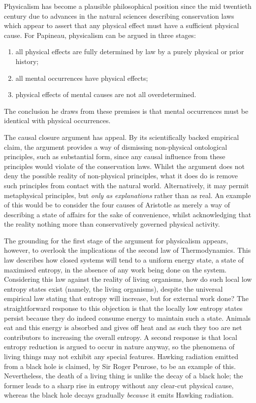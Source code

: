 Physicalism has become a plausible philosophical position since the mid twentieth century due to advances in the natural sciences describing conservation laws which appear to assert that any physical effect must have a sufficient physical cause. For Papineau, physicalism can be argued in three stages:
\begin{enumerate}
\item all physical effects are fully determined by law by a purely physical or prior history;
\item all mental occurrences have physical effects;
\item physical effects of mental causes are not all overdetermined.
\end{enumerate}
The conclusion he draws from these premises is that mental occurrences must be identical with physical occurrences. \parencite[][6]{Papineau2001-PAPTRO}

The causal closure argument has appeal. By its scientifically backed empirical claim, the argument provides a way of dismissing non-physical ontological principles, such as substantial form, since any causal influence from these principles would violate of the conservation laws. Whilst the argument does not deny the possible reality of non-physical principles, what it does do is remove such principles from contact with the natural world. Alternatively, it may permit metaphysical principles, but \emph{only as explanations} rather than as real. An example of this would be to consider the four causes of Aristotle as merely a way of describing a state of affairs for the sake of convenience, whilst acknowledging that the reality nothing more than conservatively governed physical activity.

The grounding for the first stage of the argument for physicalism appears, however, to overlook the implications of the second law of Thermodynamics. This law describes how closed systems will tend to a uniform energy state, a state of maximised entropy, in the absence of any work being done on the system. Considering this law against the reality of living organisms, how do such local low entropy states exist (namely, the living organisms), despite the universal empirical law stating that entropy will increase, but for external work done? The straightforward response to this objection is that the locally low entropy states persist because they do indeed consume energy to maintain such a state. Animals eat and this energy is absorbed and gives off heat and as such they too are net contributors to increasing the overall entropy. A second response is that local entropy reduction is argued to occur in nature anyway, so the phenomena of living things may not exhibit any special features. Hawking radiation emitted from a black hole is claimed, by Sir Roger Penrose, to be an example of this. Nevertheless, the death of a living thing is unlike the decay of a black hole; the former leads to a sharp rise in entropy without any clear-cut physical cause, whereas the black hole decays gradually \emph{because} it emits Hawking radiation.

